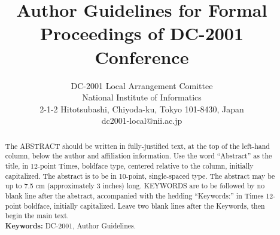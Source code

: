% 
% 



\setlength{\oddsidemargin}{-1in}
\addtolength{\oddsidemargin}{2.5cm}
\setlength{\evensidemargin}{-1in}
\addtolength{\evensidemargin}{2.5cm}
\setlength{\topmargin}{-1in}
\addtolength{\topmargin}{2.2cm}
\setlength{\headheight}{0cm}
\setlength{\headsep}{0cm}
\setlength{\textwidth}{16.0cm}
\setlength{\textheight}{24.2cm}
\setlength{\parindent}{0.4cm}
\setlength{\columnsep}{0.8cm}

\pagestyle{empty}



\title{Author Guidelines for Formal Proceedings of DC-2001 Conference}

\author{DC-2001 Local Arrangement Comittee\\
National Institute of Informatics\\ 
2-1-2 Hitotsubashi, Chiyoda-ku, Tokyo 101-8430, Japan\\
dc2001-local@nii.ac.jp
}

\maketitle
\thispagestyle{empty}

\begin{abstract}
  The ABSTRACT should be written in fully-justified text, at the top of
  the left-hand column, below the author and affiliation
  information. Use the word ``Abstract'' as the title, in 12-point
  Times, boldface type, centered relative to the column, initially
  capitalized. The abstract is to be in 10-point, single-spaced
  type. The abstract may be up to 7.5 cm (approximately 3 inches) long. 
  KEYWORDS are to be followed by no blank line after the abstract,
  accompanied with the hedding ``Keywords:'' in Times 12-point
  boldface, initially capitalized.
  Leave two blank lines after the Keywords, then begin the main text.\\
{\bf Keywords:} DC-2001, Author Guidelines. 
\end{abstract}



